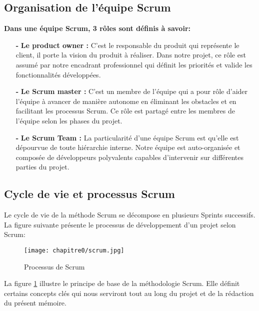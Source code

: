 \subsection{Organisation de l'équipe Scrum}

\textbf{Dans une équipe Scrum, 3 rôles sont définis à savoir: }\\

\begin{itemize}
\item[\textbf{-}] \textbf{Le product owner :} C'est le responsable du produit qui représente le client, il porte la vision du produit à réaliser. Dans notre projet, ce rôle est assumé par notre encadrant professionnel qui définit les priorités et valide les fonctionnalités développées.
\item[\textbf{-}] \textbf{Le Scrum master :} C'est un membre de l'équipe qui a pour rôle d'aider l'équipe à avancer de manière autonome en éliminant les obstacles et en facilitant les processus Scrum. Ce rôle est partagé entre les membres de l'équipe selon les phases du projet.
\item[\textbf{-}] \textbf{Le Scrum Team :} La particularité d'une équipe Scrum est qu'elle est dépourvue de toute hiérarchie interne. Notre équipe est auto-organisée et composée de développeurs polyvalents capables d'intervenir sur différentes parties du projet.
\end{itemize}

\subsection{Cycle de vie et processus Scrum}

Le cycle de vie de la méthode Scrum se décompose en plusieurs Sprints successifs. La figure suivante présente le processus de développement d'un projet selon Scrum:

\begin{figure}[H]
\centering
\texttt{[image: chapitre0/scrum.jpg]}
\caption{Processus de Scrum}
\label{fig:scrum-process}
\end{figure}

La figure \ref{fig:scrum-process} illustre le principe de base de la méthodologie Scrum. Elle définit certains concepts clés qui nous serviront tout au long du projet et de la rédaction du présent mémoire.\\

